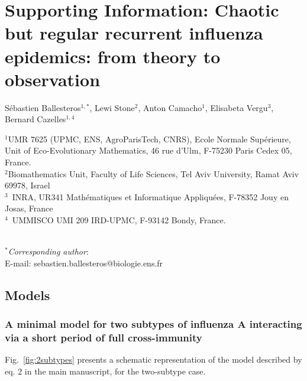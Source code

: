 \chapter{Supporting Information: Chaotic but regular recurrent
  influenza epidemics: from theory to observation}



Sébastien Ballesteros$^{1,*}$, 
Lewi Stone$^{2}$,
Anton Camacho$^{1}$,
Elisabeta Vergu$^{3}$,
Bernard Cazelles$^{1,4}$

\vspace{2cm}

$^1$UMR 7625  (UPMC, ENS, AgroParisTech, CNRS), Ecole Normale
Supérieure, Unit of Eco-Evolutionary Mathematics,  46 rue d'Ulm,
F-75230 Paris Cedex 05, France. \\
$^2$Biomathematics Unit, Faculty of Life Sciences, Tel Aviv
University, Ramat Aviv 69978, Israel \\
$^3$~INRA, UR341 Mathématiques et Informatique Appliquées, F-78352 Jouy en Josas, France \\
$^4$~UMMISCO UMI 209 IRD-UPMC, F-93142 Bondy, France.

~\\
$^*$\textit{Corresponding author}:  \\
E-mail: sebastien.ballesteros@biologie.ens.fr


\section{Models}

\subsection{A minimal model for two subtypes of influenza A interacting
    via a short period of full cross-immunity}

  Fig.~\ref{fig:2subtypes} presents a schematic representation of
  the model described by eq. 2 in the main manuscript, for the two-subtype case.
 
